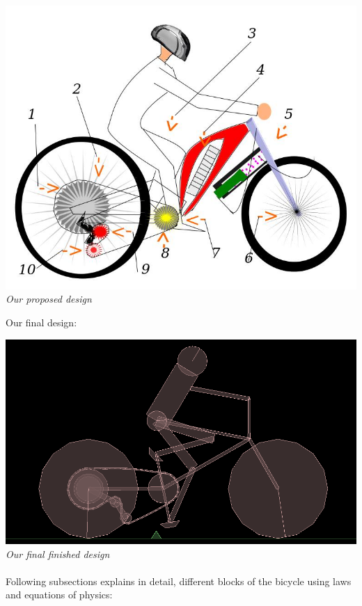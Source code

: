 \documentclass[11pt]{article}
\begin{document}
\begin{center}
  \includegraphics[scale = 0.4]{images/drawing} \\
  \emph{Our proposed design} \\
\end{center}

	Our final design:

\begin{center}
  \includegraphics[scale = 0.4]{images/complete} \\
  \emph{Our final finished design} \\
\end{center}

\paragraph{}
Following subsections explains in detail, different blocks of the bicycle using laws and equations of physics:
\end{document}
